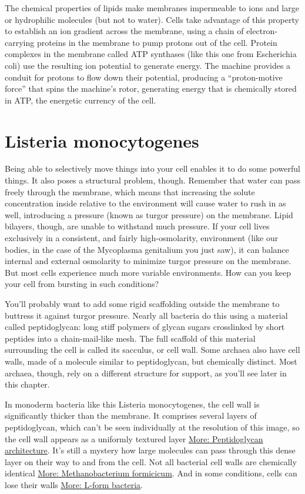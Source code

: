 \documentclass[]{tufte-book}
\begin{document}
The chemical properties of lipids make membranes impermeable to ions and
large or hydrophilic molecules (but not to water). Cells take advantage
of this property to establish an ion gradient across the membrane, using
a chain of electron-carrying proteins in the membrane to pump protons
out of the cell. Protein complexes in the membrane called ATP synthases
(like this one from Escherichia coli) use the resulting ion potential to
generate energy. The machine provides a conduit for protons to flow down
their potential, producing a ``proton-motive force'' that spins the
machine's rotor, generating energy that is chemically stored in ATP, the
energetic currency of the cell.

\section{Listeria monocytogenes}\label{listeria-monocytogenes}

Being able to selectively move things into your cell enables it to do
some powerful things. It also poses a structural problem, though.
Remember that water can pass freely through the membrane, which means
that increasing the solute concentration inside relative to the
environment will cause water to rush in as well, introducing a pressure
(known as turgor pressure) on the membrane. Lipid bilayers, though, are
unable to withstand much pressure. If your cell lives exclusively in a
consistent, and fairly high-osmolarity, environment (like our bodies, in
the case of the Mycoplasma genitalium you just saw), it can balance
internal and external osmolarity to minimize turgor pressure on the
membrane. But most cells experience much more variable environments. How
can you keep your cell from bursting in such conditions?

You'll probably want to add some rigid scaffolding outside the membrane
to buttress it against turgor pressure. Nearly all bacteria do this
using a material called peptidoglycan: long stiff polymers of glycan
sugars crosslinked by short peptides into a chain-mail-like mesh. The
full scaffold of this material surrounding the cell is called its
sacculus, or cell wall. Some archaea also have cell walls, made of a
molecule similar to peptidoglycan, but chemically distinct. Most
archaea, though, rely on a different structure for support, as you'll
see later in this chapter.

In monoderm bacteria like this Listeria monocytogenes, the cell wall is
significantly thicker than the membrane. It comprises several layers of
peptidoglycan, which can't be seen individually at the resolution of
this image, so the cell wall appears as a uniformly textured layer
\protect\hyperlink{Peptidoglycan_architecture}{More: Peptidoglycan
architecture}. It's still a mystery how large molecules can pass through
this dense layer on their way to and from the cell. Not all bacterial
cell walls are chemically identical \protect\hyperlink{}{More:
Methanobacterium formicicum}. And in some conditions, cells can lose
their walls \protect\hyperlink{}{More: L-form bacteria}.
\end{document}
